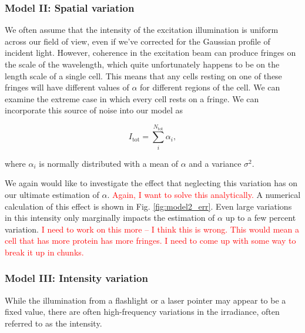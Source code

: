 \subsubsection*{Model II: Spatial variation}
We often assume that the intensity of the excitation illumination is uniform across our field of
view, even if we've corrected for the Gaussian profile of incident light. However, coherence in
the excitation beam can produce fringes on the scale of the wavelength, which quite unfortunately
happens to be on the length scale of a single cell. This means that any cells resting on one of
these fringes will have different values of $\alpha$ for different regions of the cell. We can
examine the extreme case in which every cell rests on a fringe. We can incorporate this source
of noise into our model as

\begin{equation}
  I_\text{tot} = \sum\limits_i^{N_\text{tot}} \alpha_i,
\end{equation}

where $\alpha_i$ is normally distributed with a mean of $\alpha$ and a variance $\sigma^2$.

We again would like to investigate the effect that neglecting this variation has on our ultimate
estimation of $\alpha$.
\textcolor{red}{Again, I want to solve this analytically.} A numerical calculation of this effect
is shown in Fig. \ref{fig:model2_err}. Even large variations in this intensity only marginally
impacts the estimation of $\alpha$ up to a few percent variation. \textcolor{red}{I need to work
on this more -- I think this is wrong. This would mean a cell that has more protein has more
fringes. I need to come up with some way to break it up in chunks.}

\begin{figure}
\end{figure}


\subsubsection*{Model III: Intensity variation}
While the illumination from a flashlight or a laser pointer may appear to be a fixed value, there
are often high-frequency variations in the irradiance, often referred to as the intensity.

